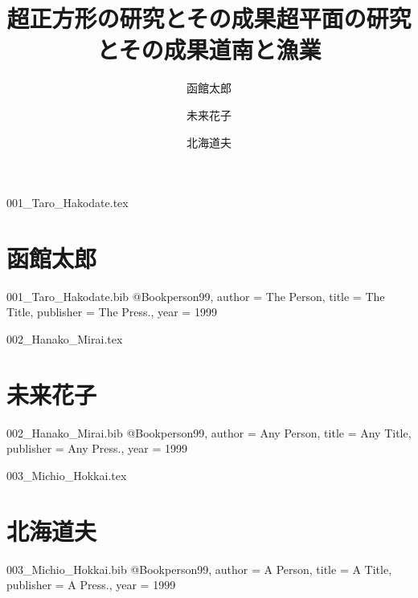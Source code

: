 ﻿%
\begin{filecontents*}{001_Taro_Hakodate.tex}
\part{函館太郎}
\author{函館太郎}
\title{超正方形の研究とその成果}
\maketitle
\nocite{person99}


\end{filecontents*}
\begin{filecontents*}{001_Taro_Hakodate.bib}
@Book{person99,
  author =	 {The Person},
  title = 	 {The Title},
  publisher = 	 {The Press.},
  year = 	 1999
}
\end{filecontents*}

\begin{filecontents*}{002_Hanako_Mirai.tex}
\part{未来花子}  
\author{未来花子}
\title{超平面の研究とその成果}
\maketitle
\nocite{person99}


\end{filecontents*}
\begin{filecontents*}{002_Hanako_Mirai.bib}
@Book{person99,
  author =	 {Any Person},
  title = 	 {Any Title},
  publisher = 	 {Any Press.},
  year = 	 1999
}
\end{filecontents*}

\begin{filecontents*}{003_Michio_Hokkai.tex}
\part{北海道夫}
\author{北海道夫}
\title{道南と漁業}
\maketitle
\nocite{person99}


\end{filecontents*}
\begin{filecontents*}{003_Michio_Hokkai.bib}
@Book{person99,
  author =	 {A Person},
  title = 	 {A Title},
  publisher = 	 {A Press.},
  year = 	 1999
}
\end{filecontents*}

